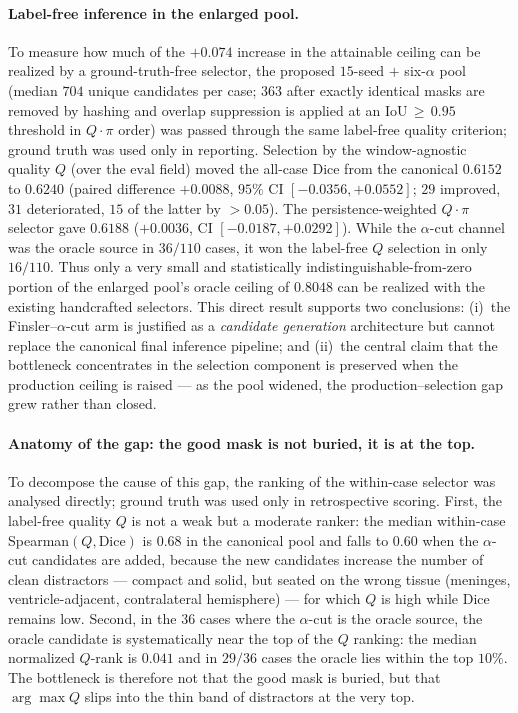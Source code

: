 \documentclass[11pt,a4paper]{article}
\begin{document}
\paragraph{Label-free inference in the enlarged pool.} To measure how much of the $+0.074$ increase in the attainable ceiling can be realized by a
ground-truth-free selector, the proposed $15$-seed $+$ six-$\alpha$ pool (median $704$ unique candidates per case; $363$ after exactly identical masks are removed by hashing and overlap suppression is applied at an IoU$\,\ge\,0.95$ threshold in $Q\cdot\pi$ order) was passed through the same label-free quality criterion; ground truth was used only in reporting. Selection by the window-agnostic quality $Q$ (over the $\mathrm{eval}$ field) moved the all-case Dice from the canonical $0.6152$ to $0.6240$ (paired difference $+0.0088$, $95\%$ CI $[-0.0356,+0.0552]$; $29$ improved, $31$ deteriorated, $15$ of the latter by $>0.05$). The persistence-weighted $Q\cdot\pi$ selector gave $0.6188$ ($+0.0036$, CI $[-0.0187,+0.0292]$). While the $\alpha$-cut channel was the oracle source in $36/110$ cases, it won the label-free $Q$ selection in only $16/110$. Thus only a very small and statistically indistinguishable-from-zero portion of the enlarged
pool's oracle ceiling of $0.8048$ can be realized with the existing handcrafted selectors. This direct result supports two conclusions: (i)~the
Finsler--$\alpha$-cut arm is justified as a \emph{candidate generation}
architecture but cannot replace the canonical final inference pipeline; and
(ii)~the central claim that the bottleneck concentrates in the selection component is preserved when the production ceiling is raised --- as the pool widened, the production--selection gap grew rather than closed.

\paragraph{Anatomy of the gap: the good mask is not buried, it is at the top.} To decompose the cause of this gap, the ranking of the within-case selector was analysed directly; ground truth was used only in retrospective scoring. First, the label-free quality $Q$ is not a weak but a moderate ranker: the median within-case Spearman$(Q,\text{Dice})$ is $0.68$ in the canonical pool and falls to $0.60$ when the $\alpha$-cut candidates are added, because the new candidates increase the number of clean distractors --- compact and solid, but seated on the wrong tissue (meninges, ventricle-adjacent, contralateral hemisphere) --- for which $Q$ is high
while Dice remains low. Second, in the $36$ cases where the $\alpha$-cut is the oracle source, the oracle candidate is systematically near the top of the $Q$ ranking: the median normalized $Q$-rank is $0.041$ and in $29/36$ cases the oracle lies within the top $10\%$. The bottleneck is therefore not that the good mask is buried, but that $\arg\max Q$ slips into the thin band of distractors at the very top.
\end{document}
